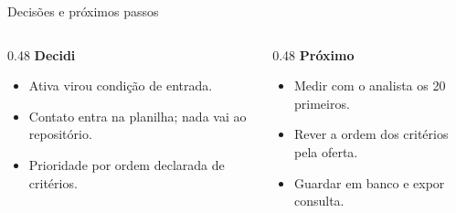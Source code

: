 \documentclass[aspectratio=169]{beamer}
\begin{document}
\begin{frame}{Decisões e próximos passos}
    \begin{columns}[T]
        \begin{column}{0.48\textwidth}
            \textbf{Decidi}
            \begin{itemize}
                \item Ativa virou condição de entrada.
                \item Contato entra na planilha; nada vai ao repositório.
                \item Prioridade por ordem declarada de critérios.
            \end{itemize}
        \end{column}
        \begin{column}{0.48\textwidth}
            \textbf{Próximo}
            \begin{itemize}
                \item Medir com o analista os 20 primeiros.
                \item Rever a ordem dos critérios pela oferta.
                \item Guardar em banco e expor consulta.
            \end{itemize}
        \end{column}
    \end{columns}
\end{frame}
\end{document}
